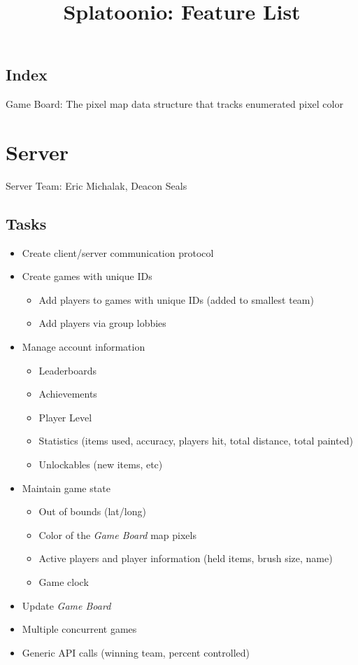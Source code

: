 \documentclass{article}
\title{Splatoonio: Feature List}
\author{}
\date{\vspace{-5ex}} %
\begin{document}
\maketitle
\tableofcontents

\subsection*{Index}
Game Board: The pixel map data structure that tracks enumerated pixel color

\newpage
\section{Server}
Server Team: Eric Michalak, Deacon Seals
\subsection{Tasks}
\begin{itemize}
\item Create client/server communication protocol
\item Create games with unique IDs
\begin{itemize}
	\item Add players to games with unique IDs (added to smallest team)
	\item Add players via group lobbies 
\end{itemize}
\item Manage account information
	\begin{itemize}
	\item Leaderboards
    \item Achievements
    \item Player Level
    \item Statistics (items used, accuracy, players hit, total distance, total painted) 
    \item Unlockables (new items, etc) 
	\end{itemize}
\item Maintain game state
	\begin{itemize}
	\item Out of bounds (lat/long)
    \item Color of the \emph{Game Board} map pixels
    \item Active players and player information (held items, brush size, name)
    \item Game clock
	\end{itemize}
\item Update \emph{Game Board}
\item Multiple concurrent games
\item Generic API calls (winning team, percent controlled)
\end{itemize}
\end{document}
